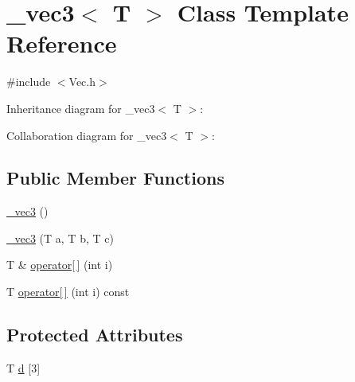 \hypertarget{class__vec3}{}\section{\+\_\+vec3$<$ T $>$ Class Template Reference}
\label{class__vec3}


{\ttfamily \#include $<$Vec.\+h$>$}



Inheritance diagram for \+\_\+vec3$<$ T $>$\+:


Collaboration diagram for \+\_\+vec3$<$ T $>$\+:
\subsection*{Public Member Functions}
\begin{DoxyCompactItemize}
\item 
\hyperlink{class__vec3_a6d4f886401b1bba2ca49a2918c2ad5dc}{\+\_\+vec3} ()
\item 
\hyperlink{class__vec3_ae790417c9b3713558524c2136951bcaa}{\+\_\+vec3} (T a, T b, T c)
\item 
T \& \hyperlink{class__vec3_a2740a2fc35b6431b037e933d7554abaf}{operator\mbox{[}$\,$\mbox{]}} (int i)
\item 
T \hyperlink{class__vec3_a047b9cbc385e14f313a4f5de392923df}{operator\mbox{[}$\,$\mbox{]}} (int i) const
\end{DoxyCompactItemize}
\subsection*{Protected Attributes}
\begin{DoxyCompactItemize}
\item 
T \hyperlink{class__vec3_a5b0c52131143a6e240867d956714a52a}{d} \mbox{[}3\mbox{]}
\end{DoxyCompactItemize}
